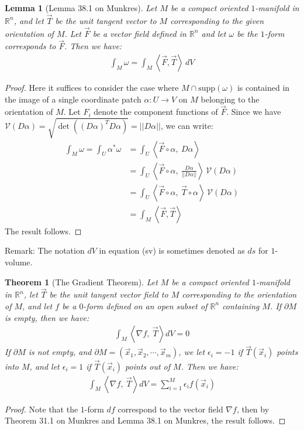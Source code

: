 \documentclass[11pt,oneside]{book}
\theoremstyle{break}
\theoremstyle{break}
\newtheorem{thm}{Theorem}[section]
\newtheorem{lem}{Lemma}[thm]
\newcommand{\R}{\mathbb{R}}
\newcommand{\supp}{\text{supp}}
\newcommand{\remark}{\color{blue}Remark: \color{black}}
\begin{document}
\begin{lem}[Lemma 38.1 on Munkres]
Let $M$ be a compact oriented $1$-manifold in $\R^n$, and let $\vec{T}$ be the unit tangent vector to $M$ corresponding to the given orientation of $M$. Let $\vec{F}$ be a vector field defined in $\R^n$ and let $\omega$ be the $1$-form corresponds to $\vec{F}$. Then we have:
\begin{align*}
\int_M \omega = \int_M \left< \vec{F}, \vec{T}\right> \, dV \tag{sv}
\end{align*} 
\end{lem}
\begin{proof}
Here it suffices to consider the case where $M\cap \supp(\omega)$ is contained in the image of a single coordinate patch $\alpha:U \to V$ on $M$ belonging to the orientation of $M$. Let $F_i$ denote the component functions of $\vec{F}$. Since we have $\mathcal{V}(D\alpha) = \sqrt{\det((D\alpha)^T D\alpha)} = ||D\alpha||$, we can write:
\begin{align*}
\int_M \omega = \int_U \alpha^*\omega &= \int_U \left< \vec{F} \circ \alpha, \ D\alpha\right> \\
&= \int_U \left< \vec{F}\circ \alpha,\ \frac{D\alpha}{||D\alpha||} \right> \,\mathcal{V}(D\alpha)\\
&= \int_U \left< \vec{F}\circ \alpha,\ \vec{T}\circ \alpha \right> \,\mathcal{V}(D\alpha)\\
&= \int_M \left< \vec{F}, \vec{T}\right>
\end{align*}
The result follows.
\end{proof}

\remark The notation $dV$ in equation (sv) is sometimes denoted as $ds$ for $1$-volume. \\

\begin{thm}[The Gradient Theorem]
Let $M$ be a compact oriented $1$-manifold in $\R^n$, let $\vec{T}$ be the unit tangent vector field to $M$ corresponding to the orientation of $M$, and let $f$ be a $0$-form defined on an open subset of $\R^n$ containing $M$. If $\partial M$ is empty, then we have:
\begin{align*}
 \int_M \left< \nabla f,\ \vec{T}\right> dV = 0
\end{align*}
If $\partial M$ is not empty, and $\partial M = (\vec{x}_1,\vec{x}_2,\cdots, \vec{x}_m)$, we let $\epsilon_i = -1$ if $\vec{T}(\vec{x}_i)$ points into $M$,  and let $\epsilon_i = 1$ if $\vec{T}(\vec{x}_i)$ points out of $M$. Then we have:
\begin{align*}
 \int_M \left< \nabla f,\ \vec{T}\right> dV =  \sum_{i=1}^M \epsilon_i f(\vec{x}_i) 
\end{align*}
\end{thm}
\begin{proof}
Note that the $1$-form $df$ correspond to the vector field $\nabla f$, then by Theorem 31.1 on Munkres and Lemma 38.1 on Munkres, the result follows.
\end{proof}
\end{document}
